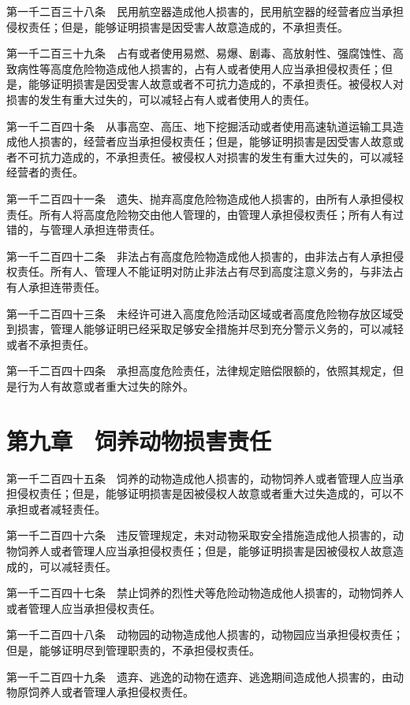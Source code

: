 \documentclass[UTF8,12pt,a4paper]{ctexbook}
\begin{document}
第一千二百三十八条　民用航空器造成他人损害的，民用航空器的经营者应当承担侵权责任；但是，能够证明损害是因受害人故意造成的，不承担责任。

第一千二百三十九条　占有或者使用易燃、易爆、剧毒、高放射性、强腐蚀性、高致病性等高度危险物造成他人损害的，占有人或者使用人应当承担侵权责任；但是，能够证明损害是因受害人故意或者不可抗力造成的，不承担责任。被侵权人对损害的发生有重大过失的，可以减轻占有人或者使用人的责任。

第一千二百四十条　从事高空、高压、地下挖掘活动或者使用高速轨道运输工具造成他人损害的，经营者应当承担侵权责任；但是，能够证明损害是因受害人故意或者不可抗力造成的，不承担责任。被侵权人对损害的发生有重大过失的，可以减轻经营者的责任。

第一千二百四十一条　遗失、抛弃高度危险物造成他人损害的，由所有人承担侵权责任。所有人将高度危险物交由他人管理的，由管理人承担侵权责任；所有人有过错的，与管理人承担连带责任。

第一千二百四十二条　非法占有高度危险物造成他人损害的，由非法占有人承担侵权责任。所有人、管理人不能证明对防止非法占有尽到高度注意义务的，与非法占有人承担连带责任。

第一千二百四十三条　未经许可进入高度危险活动区域或者高度危险物存放区域受到损害，管理人能够证明已经采取足够安全措施并尽到充分警示义务的，可以减轻或者不承担责任。

第一千二百四十四条　承担高度危险责任，法律规定赔偿限额的，依照其规定，但是行为人有故意或者重大过失的除外。

\section*{第九章　饲养动物损害责任}

第一千二百四十五条　饲养的动物造成他人损害的，动物饲养人或者管理人应当承担侵权责任；但是，能够证明损害是因被侵权人故意或者重大过失造成的，可以不承担或者减轻责任。

第一千二百四十六条　违反管理规定，未对动物采取安全措施造成他人损害的，动物饲养人或者管理人应当承担侵权责任；但是，能够证明损害是因被侵权人故意造成的，可以减轻责任。

第一千二百四十七条　禁止饲养的烈性犬等危险动物造成他人损害的，动物饲养人或者管理人应当承担侵权责任。

第一千二百四十八条　动物园的动物造成他人损害的，动物园应当承担侵权责任；但是，能够证明尽到管理职责的，不承担侵权责任。

第一千二百四十九条　遗弃、逃逸的动物在遗弃、逃逸期间造成他人损害的，由动物原饲养人或者管理人承担侵权责任。
\end{document}

